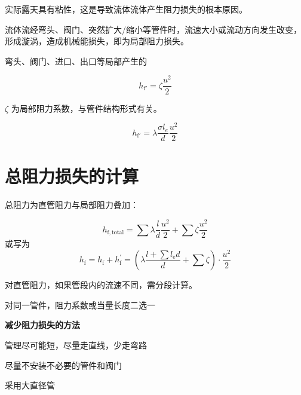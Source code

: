 \documentclass{book}
\DeclareRobustCommand{\bluebold}[1]{\textbf{\textcolor[rgb]{0.31,0.63,0.86}{#1}}}
\begin{document}
实际露天具有粘性，这是导致流体流体产生阻力损失的根本原因。

流体流经弯头、阀门、突然扩大/缩小等管件时，流速大小或流动方向发生改变，形成漩涡，造成机械能损失，即为局部阻力损失。

弯头、阀门、进口、出口等局部产生的

\begin{equation}
h_\mathrm{f'} = \zeta \frac{u^2}{2}
\end{equation}

$\zeta$ 为局部阻力系数，与管件结构形式有关。

\begin{equation}
h_\mathrm{f'} = \lambda \frac{\sigma l_e}{d} \frac{u^2}{2}
\label{eq:local-resistance}
\end{equation}

\chapter{总阻力损失的计算}

总阻力为直管阻力与局部阻力叠加：

\begin{equation}
h_{\mathrm{f},\mathrm{total}} = \sum \lambda\frac{l}{d}\frac{u^2}{2} + \sum \zeta\frac{u^2}{2}
\label{eq:total-resistance}
\end{equation}
或写为
\begin{equation}
h_{\mathrm{f}} = h_{\mathrm{f}} + h^\mathbf{'}_{\mathrm{f}} = \left(\lambda\frac{l + \sum l_\mathrm{e}{d}}{d} + \sum \zeta \right) \cdot \frac{u^2}{2}
\end{equation}

对直管阻力，如果管段内的流速不同，需分段计算。

对同一管件，阻力系数或当量长度二选一

\bluebold{减少阻力损失的方法}

管理尽可能短，尽量走直线，少走弯路

尽量不安装不必要的管件和阀门

采用大直径管
\end{document}
